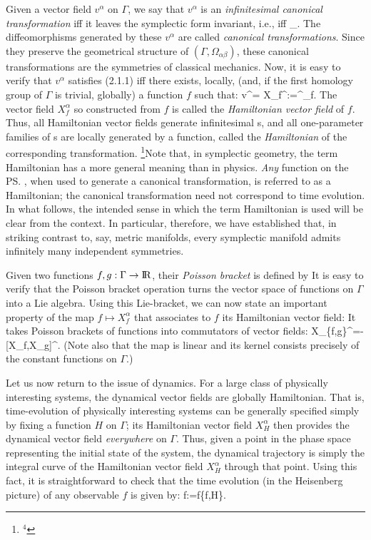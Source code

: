 Given a vector field $v^\alpha$ on $\Gamma$, we say that $v^\alpha$ is an {\it
infinitesimal canonical transformation} iff it leaves the symplectic form
invariant, i.e., iff
\bneq
{}\Omega_.
The diffeomorphisms generated by these $v^\alpha$ are called {\it canonical
transformations}. Since they preserve the geometrical structure of $(\Gamma,
\Omega_{\alpha\beta})$, these canonical  transformations are the symmetries
of classical mechanics. Now, it is easy to verify that $v^\alpha$ satisfies
(2.1.1) iff there exists, locally, (and, if the first homology group of
$\Gamma$ is trivial, globally) a function $f$ such that:
\bneq
v^\alpha = X_f^\alpha:=\Omega^\ab\nab_\beta f.
The vector field $X_f^\alpha$ so constructed from $f$ is called the {\it
Hamiltonian vector field} of $f$. Thus, all Hamiltonian vector fields generate
infinitesimal \ct s, and all one-parameter families of \ct s are locally
generated by a function, called the {\it Hamiltonian} of the corresponding
transformation.%
\footnote{$^4$}{Note that, in symplectic geometry, the term Hamiltonian
has a more general meaning than in physics. {\it Any} function on the
\ps, when used to generate a canonical transformation, is referred to as
a Hamiltonian; the canonical transformation need not correspond to time
evolution. In what follows, the intended sense in which the term
Hamiltonian is used will be clear from the context.}
In particular, therefore, we have established that, in striking contrast
to, say, metric manifolds, every symplectic manifold admits infinitely many
independent symmetries.

Given two functions $f,g:\Gamma\rightarrow{\rm I\!R}$, their {\it Poisson bracket} is
defined by
It is easy to verify that the Poisson bracket operation turns the vector
space of functions on $\Gamma$ into a Lie algebra. Using this Lie-bracket,
we can now state an important property of the map $f\mapsto X_f^\alpha$
that associates to $f$ its Hamiltonian vector field: It takes Poisson
brackets of functions into commutators of vector fields:
\bneq
X_{\{f,g\}}^\alpha=-[X_f,X_g]^\alpha.
(Note also that the map is linear and its kernel consists precisely of the
constant functions on $\Gamma$.)

Let us now return to the issue of dynamics. For a large class of physically
interesting systems, the dynamical vector fields are globally Hamiltonian.
That is, time-evolution of physically interesting systems can be generally
specified simply by fixing a function $H$ on $\Gamma$; its Hamiltonian vector
field $X_H^\alpha$ then provides the dynamical vector field {\it everywhere}
on $\Gamma$. Thus, given a point in the phase space representing the initial
state of the system, the dynamical trajectory is simply the integral curve of
the Hamiltonian vector field $X_H^\alpha$ through that point. Using this fact,
it is straightforward to check that the time evolution (in the Heisenberg
picture) of any observable $f$ is given by:
\bneq
\dot f:=f\equiv\{f,H\}.

